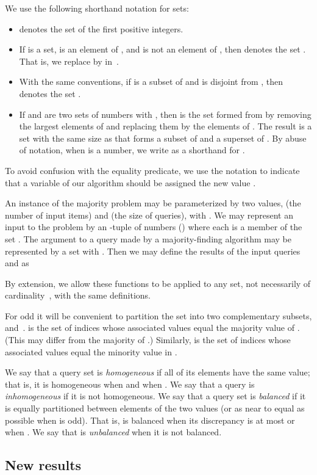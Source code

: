 \documentclass[11pt]{llncs}
\begin{document}
We use the following shorthand notation for sets:
\begin{itemize}
\item  denotes the set  of the first  positive integers.
\item If  is a set,  is an element of , and  is not an element of ,
then  denotes the set . That is, we replace  by  in~.
\item With the same conventions, if  is a subset of  and  is disjoint from ,
then  denotes the set .
\item If  and  are two sets of numbers with , then  is the set formed from  by removing the  largest elements of  and replacing them by the elements of . The result is a set with the same size as  that forms a subset of  and a superset of .
By abuse of notation, when  is a number, we write  as a shorthand for .
\end{itemize}
To avoid confusion with the equality predicate, we use the notation  to indicate that a variable  of our algorithm should be assigned the new value .

An instance of the majority problem may be parameterized by two values,  (the number of input items) and  (the size of queries), with .
We may represent an input to the problem by an -tuple  of numbers  () where each  is a member of the set . The argument to a query made by a majority-finding algorithm may be represented by a set  with . Then we may define the results of the input queries  and  as


By extension, we allow these functions to be applied to any set, not necessarily of cardinality~, with the same definitions.

For odd  it will be convenient to partition the set  into two complementary subsets,  and~.  is the set of indices  whose associated values  equal the majority value of . (This may differ from the majority of .) Similarly,  is the set of indices  whose associated values  equal the minority value in .

We say that a query set  is \emph{homogeneous} if all of its elements have the same value; that is, it is homogeneous when  and when . We say that a query is \emph{inhomogeneous} if it is not homogeneous. We say that a query set is \emph{balanced} if it is equally partitioned between elements of the two values (or as near to equal as possible when  is odd). That is,  is balanced when its discrepancy is at most  or when . We say that  is \emph{unbalanced} when it is not balanced.

\subsection{New results}
\end{document}
